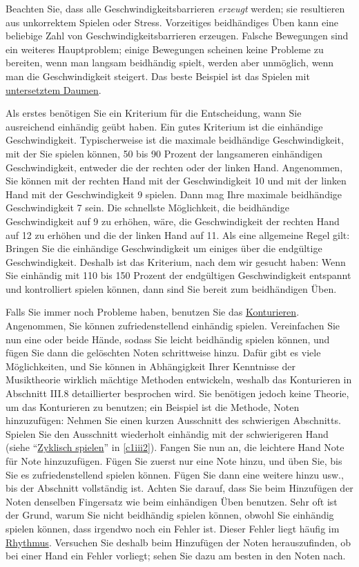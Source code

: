 Beachten Sie, dass alle Geschwindigkeitsbarrieren \textit{erzeugt} werden; sie resultieren aus unkorrektem Spielen oder Stress.
Vorzeitiges beidhändiges Üben kann eine beliebige Zahl von Geschwindigkeitsbarrieren erzeugen.
Falsche Bewegungen sind ein weiteres Hauptproblem; einige Bewegungen scheinen keine Probleme zu bereiten, wenn man langsam beidhändig spielt, werden aber unmöglich, wenn man die Geschwindigkeit steigert.
Das beste Beispiel ist das Spielen mit \hyperref[c1iii5a]{untersetztem Daumen}.

Als erstes benötigen Sie ein Kriterium für die Entscheidung, wann Sie ausreichend einhändig geübt haben.
Ein gutes Kriterium ist die einhändige Geschwindigkeit.
Typischerweise ist die maximale beidhändige Geschwindigkeit, mit der Sie spielen können, 50 bis 90 Prozent der langsameren einhändigen Geschwindigkeit, entweder die der rechten oder der linken Hand.
Angenommen, Sie können mit der rechten Hand mit der Geschwindigkeit 10 und mit der linken Hand mit der Geschwindigkeit 9 spielen.
Dann mag Ihre maximale beidhändige Geschwindigkeit 7 sein.
Die schnellste Möglichkeit, die beidhändige Geschwindigkeit auf 9 zu erhöhen, wäre, die Geschwindigkeit der rechten Hand auf 12 zu erhöhen und die der linken Hand auf 11.
Als eine allgemeine Regel gilt: Bringen Sie die einhändige Geschwindigkeit um einiges über die endgültige Geschwindigkeit.
Deshalb ist das Kriterium, nach dem wir gesucht haben: Wenn Sie einhändig mit 110 bis 150 Prozent der endgültigen Geschwindigkeit entspannt und kontrolliert spielen können, dann sind Sie bereit zum beidhändigen Üben.


\hypertarget{notenweise}{}

Falls Sie immer noch Probleme haben, benutzen Sie das \hyperref[c1iii8]{Konturieren}.
Angenommen, Sie können zufriedenstellend einhändig spielen.
Vereinfachen Sie nun eine oder beide Hände, sodass Sie leicht beidhändig spielen können, und fügen Sie dann die gelöschten Noten schrittweise hinzu.
Dafür gibt es viele Möglichkeiten, und Sie können in Abhängigkeit Ihrer Kenntnisse der Musiktheorie wirklich mächtige Methoden entwickeln, weshalb das Konturieren in Abschnitt III.8 detaillierter besprochen wird.
Sie benötigen jedoch keine Theorie, um das Konturieren zu benutzen; ein Beispiel ist die Methode, Noten hinzuzufügen: Nehmen Sie einen kurzen Ausschnitt des schwierigen Abschnitts.
Spielen Sie den Ausschnitt wiederholt einhändig mit der schwierigeren Hand (siehe \enquote{\hyperref[c1iii2]{Zyklisch spielen}} in \ref*{c1iii2}).
Fangen Sie nun an, die leichtere Hand Note für Note hinzuzufügen.
Fügen Sie zuerst nur eine Note hinzu, und üben Sie, bis Sie es zufriedenstellend spielen können.
Fügen Sie dann eine weitere hinzu usw., bis der Abschnitt vollständig ist.
Achten Sie darauf, dass Sie beim Hinzufügen der Noten denselben Fingersatz wie beim einhändigen Üben benutzen.
Sehr oft ist der Grund, warum Sie nicht beidhändig spielen können, obwohl Sie einhändig spielen können, dass irgendwo noch ein Fehler ist.
Dieser Fehler liegt häufig im \hyperref[c1iii1b]{Rhythmus}.
Versuchen Sie deshalb beim Hinzufügen der Noten herauszufinden, ob bei einer Hand ein Fehler vorliegt;
sehen Sie dazu am besten in den Noten nach.

